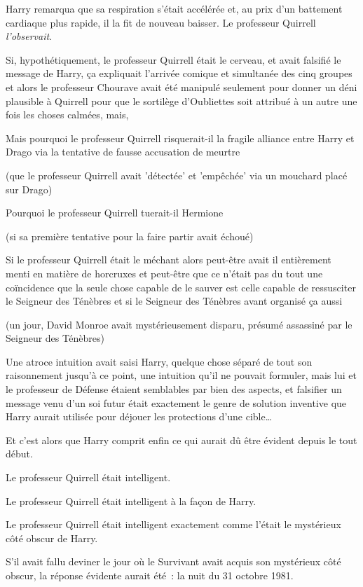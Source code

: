 Harry remarqua que sa respiration s'était accélérée et, au prix d'un battement cardiaque plus rapide, il la fit de nouveau baisser. Le professeur Quirrell \emph{l'observait}.

Si, hypothétiquement, le professeur Quirrell était le cerveau, et avait falsifié le message de Harry, ça expliquait l'arrivée comique et simultanée des cinq groupes et alors le professeur Chourave avait été manipulé seulement pour donner un déni plausible à Quirrell pour que le sortilège d'Oubliettes soit attribué à un autre une fois les choses calmées, mais,

Mais pourquoi le professeur Quirrell risquerait-il la fragile alliance entre Harry et Drago via la tentative de fausse accusation de meurtre

(que le professeur Quirrell avait 'détectée' et 'empêchée' via un mouchard placé sur Drago)

Pourquoi le professeur Quirrell tuerait-il Hermione

(si sa première tentative pour la faire partir avait échoué)

Si le professeur Quirrell était le méchant alors peut-être avait il entièrement menti en matière de horcruxes et peut-être que ce n'était pas du tout une coïncidence que la seule chose capable de le sauver est celle capable de ressusciter le Seigneur des Ténèbres et si le Seigneur des Ténèbres avant organisé ça aussi

(un jour, David Monroe avait mystérieusement disparu, présumé assassiné par le Seigneur des Ténèbres)

Une atroce intuition avait saisi Harry, quelque chose séparé de tout son raisonnement jusqu'à ce point, une intuition qu'il ne pouvait formuler, mais lui et le professeur de Défense étaient semblables par bien des aspects, et falsifier un message venu d'un soi futur était exactement le genre de solution inventive que Harry aurait utilisée pour déjouer les protections d'une cible…

Et c'est alors que Harry comprit enfin ce qui aurait dû être évident depuis le tout début.

\later

Le professeur Quirrell était intelligent.

Le professeur Quirrell était intelligent à la façon de Harry.

Le professeur Quirrell était intelligent exactement comme l'était le mystérieux côté obscur de Harry.

S'il avait fallu deviner le jour où le Survivant avait acquis son mystérieux côté obscur, la réponse évidente aurait été~: la nuit du 31 octobre 1981.

